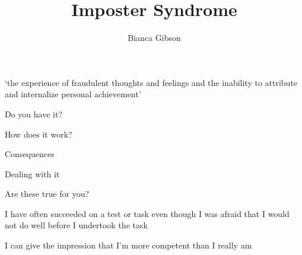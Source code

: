 \documentclass[aspectratio=169]{beamer}
\title{Imposter Syndrome}
\author{Bianca Gibson}
\institute{Pycon AU 2016}
\date{}
\begin{document}
\frame{\titlepage}

\begin{frame}
  \begin{center}
    \Huge `the experience of fraudulent thoughts and feelings and the inability to attribute and internalize personal achievement'
    \\ \small \cite{hh15}
  \end{center}
\end{frame}

\begin{frame}
  \begin{center}
    \Huge Do you have it?
  \end{center}
\end{frame}

\begin{frame}
  \begin{center}
    \Huge How does it work?
  \end{center}
\end{frame}

\begin{frame}
  \begin{center}
    \Huge Consequences
  \end{center}
\end{frame}

\begin{frame}
  \begin{center}
    \Huge Dealing with it
  \end{center}
\end{frame}

\begin{frame}
  \begin{center}
    \Huge Are these true for you?
    \\ \small \cite{clance85}
  \end{center}
\end{frame}

\begin{frame}
  \begin{center}
    \Huge  I have often succeeded on a test or task even though I was afraid that I would not do well before I undertook the task
  \end{center}
\end{frame}

\begin{frame}
  \begin{center}
    \Huge  I can give the impression that I’m more competent than I really am
  \end{center}
\end{frame}
\end{document}
